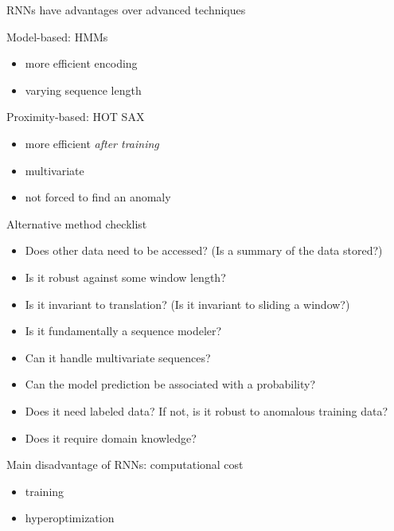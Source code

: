 \documentclass{beamer}
\begin{document}
    \begin{frame}{RNNs have advantages over advanced techniques}

      Model-based: HMMs
      \begin{itemize}
        \item more efficient encoding
        \item varying sequence length
      \end{itemize}

      Proximity-based: HOT SAX
      \begin{itemize}
        \item more efficient \emph{after training}
        \item multivariate
        \item not forced to find an anomaly
      \end{itemize}

    \end{frame}


    \begin{frame}{Alternative method checklist}

      \begin{itemize}
      \item Does other data need to be accessed?%
        (Is a summary of the data stored?)

      \item Is it robust against some window length?

      \item Is it invariant to translation? (Is it invariant to sliding a window?)

      \item Is it fundamentally a sequence modeler?

      \item Can it handle multivariate sequences?

      \item Can the model prediction be associated with a probability?

      \item Does it need labeled data? If not, is it robust to anomalous training data?

      \item Does it require domain knowledge?

      \end{itemize}

    \end{frame}


    \begin{frame}{Main disadvantage of RNNs: computational cost}
      \begin{itemize}
        \item training
        \item hyperoptimization
      \end{itemize}
        
    \end{frame}
\end{document}
